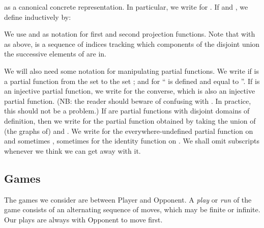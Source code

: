 \documentclass[11pt]{article}
\begin{document}
as a canonical concrete representation. In particular, we write
 for .
If  and ,
we define  inductively by:

We use  and  as notation for first and second projection functions.
Note that with  as above,  is a sequence of indices  tracking which components of the disjoint union the
successive elements of  are in.

We will also need some notation for manipulating partial functions.
We write  if  is a partial function from the set  to
the set ; and  for `` is defined and equal to ''.
If  is an injective partial function, we write   for the converse, which is also an injective partial function.
(NB: the reader should beware of confusing  with .
In practice, this should not be a problem.)
If  are partial functions with disjoint domains
of definition, then we write   for the
partial function obtained by taking  the union of (the graphs of)  and .
We write  for the everywhere-undefined partial function on  and
sometimes , sometimes  for the identity function on .
We shall omit subscripts whenever we think
we can get away with it.

\subsection{Games}
The games we consider are between Player and Opponent.  A {\em play} or {\em
run} of the game consists of an alternating sequence of moves, which may be
finite or infinite.  Our plays are always with Opponent to move first.
\end{document}
